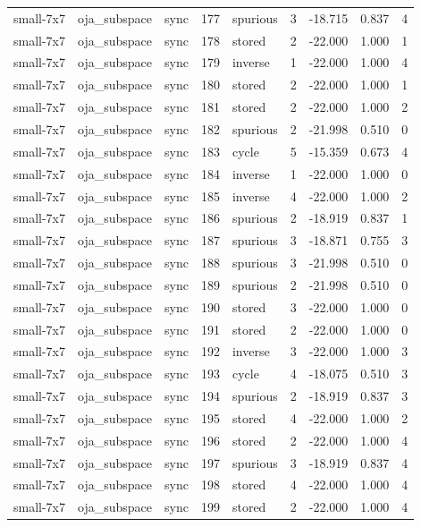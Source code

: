 \begin{tabular}{lllrlrrrr}
small-7x7 & oja\_subspace & sync & 177 & spurious & 3 & -18.715 & 0.837 & 4 \\
small-7x7 & oja\_subspace & sync & 178 & stored & 2 & -22.000 & 1.000 & 1 \\
small-7x7 & oja\_subspace & sync & 179 & inverse & 1 & -22.000 & 1.000 & 4 \\
small-7x7 & oja\_subspace & sync & 180 & stored & 2 & -22.000 & 1.000 & 1 \\
small-7x7 & oja\_subspace & sync & 181 & stored & 2 & -22.000 & 1.000 & 2 \\
small-7x7 & oja\_subspace & sync & 182 & spurious & 2 & -21.998 & 0.510 & 0 \\
small-7x7 & oja\_subspace & sync & 183 & cycle & 5 & -15.359 & 0.673 & 4 \\
small-7x7 & oja\_subspace & sync & 184 & inverse & 1 & -22.000 & 1.000 & 0 \\
small-7x7 & oja\_subspace & sync & 185 & inverse & 4 & -22.000 & 1.000 & 2 \\
small-7x7 & oja\_subspace & sync & 186 & spurious & 2 & -18.919 & 0.837 & 1 \\
small-7x7 & oja\_subspace & sync & 187 & spurious & 3 & -18.871 & 0.755 & 3 \\
small-7x7 & oja\_subspace & sync & 188 & spurious & 3 & -21.998 & 0.510 & 0 \\
small-7x7 & oja\_subspace & sync & 189 & spurious & 2 & -21.998 & 0.510 & 0 \\
small-7x7 & oja\_subspace & sync & 190 & stored & 3 & -22.000 & 1.000 & 0 \\
small-7x7 & oja\_subspace & sync & 191 & stored & 2 & -22.000 & 1.000 & 0 \\
small-7x7 & oja\_subspace & sync & 192 & inverse & 3 & -22.000 & 1.000 & 3 \\
small-7x7 & oja\_subspace & sync & 193 & cycle & 4 & -18.075 & 0.510 & 3 \\
small-7x7 & oja\_subspace & sync & 194 & spurious & 2 & -18.919 & 0.837 & 3 \\
small-7x7 & oja\_subspace & sync & 195 & stored & 4 & -22.000 & 1.000 & 2 \\
small-7x7 & oja\_subspace & sync & 196 & stored & 2 & -22.000 & 1.000 & 4 \\
small-7x7 & oja\_subspace & sync & 197 & spurious & 3 & -18.919 & 0.837 & 4 \\
small-7x7 & oja\_subspace & sync & 198 & stored & 4 & -22.000 & 1.000 & 4 \\
small-7x7 & oja\_subspace & sync & 199 & stored & 2 & -22.000 & 1.000 & 4 \\

\end{tabular}
